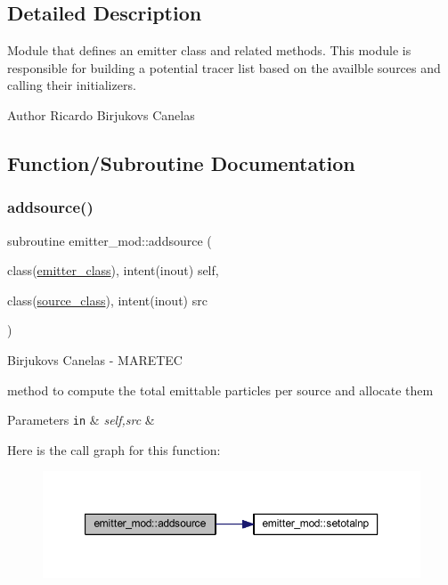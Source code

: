\subsection{Detailed Description}
Module that defines an emitter class and related methods. This module is responsible for building a potential tracer list based on the availble sources and calling their initializers. 

\begin{DoxyAuthor}{Author}
Ricardo Birjukovs Canelas 
\end{DoxyAuthor}


\subsection{Function/\+Subroutine Documentation}
\mbox{\label{namespaceemitter__mod_ab704fb0e2eb9b3b4b9542706b6fb4eaf}} 
\subsubsection{\texorpdfstring{addsource()}{addsource()}}
{\footnotesize\ttfamily subroutine emitter\+\_\+mod\+::addsource (\begin{DoxyParamCaption}\item[{class(\hyperlink{structemitter__mod_1_1emitter__class}{emitter\+\_\+class}), intent(inout)}]{self,  }\item[{class(\hyperlink{structsources__mod_1_1source__class}{source\+\_\+class}), intent(inout)}]{src }\end{DoxyParamCaption})\hspace{0.3cm}{\ttfamily [private]}}



Birjukovs Canelas -\/ M\+A\+R\+E\+T\+EC 

method to compute the total emittable particles per source and allocate them 
\begin{DoxyParams}[1]{Parameters}
\mbox{\tt in}  & {\em self,src} & \\
\hline
\end{DoxyParams}
Here is the call graph for this function\+:
\nopagebreak
\begin{figure}[H]
\begin{center}
\leavevmode
\includegraphics[width=350pt]{namespaceemitter__mod_ab704fb0e2eb9b3b4b9542706b6fb4eaf_cgraph}
\end{center}
\end{figure}
\mbox{\label{namespaceemitter__mod_a7c677125988390e4c57909e4ea82d902}} 
